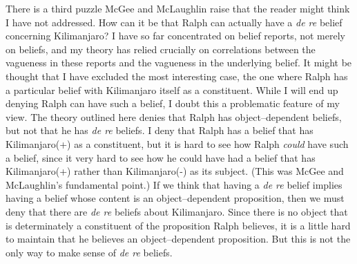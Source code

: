 \documentclass[
  11pt,
  letterpaper,
  DIV=11,
  numbers=noendperiod,
  oneside]{scrartcl}
\begin{document}
There is a third puzzle McGee and McLaughlin raise that the reader might
think I have not addressed. How can it be that Ralph can actually have a
\emph{de re} belief concerning Kilimanjaro? I have so far concentrated
on belief reports, not merely on beliefs, and my theory has relied
crucially on correlations between the vagueness in these reports and the
vagueness in the underlying belief. It might be thought that I have
excluded the most interesting case, the one where Ralph has a particular
belief with Kilimanjaro itself as a constituent. While I will end up
denying Ralph can have such a belief, I doubt this a problematic feature
of my view. The theory outlined here denies that Ralph has
object--dependent beliefs, but not that he has \emph{de re} beliefs. I
deny that Ralph has a belief that has Kilimanjaro(+) as a constituent,
but it is hard to see how Ralph \emph{could} have such a belief, since
it very hard to see how he could have had a belief that has
Kilimanjaro(+) rather than Kilimanjaro(-) as its subject. (This was
McGee and McLaughlin's fundamental point.) If we think that having a
\emph{de re} belief implies having a belief whose content is an
object--dependent proposition, then we must deny that there are \emph{de
re} beliefs about Kilimanjaro. Since there is no object that is
determinately a constituent of the proposition Ralph believes, it is a
little hard to maintain that he believes an object--dependent
proposition.
But this is not the only way to make sense of \emph{de re} beliefs.
\end{document}
